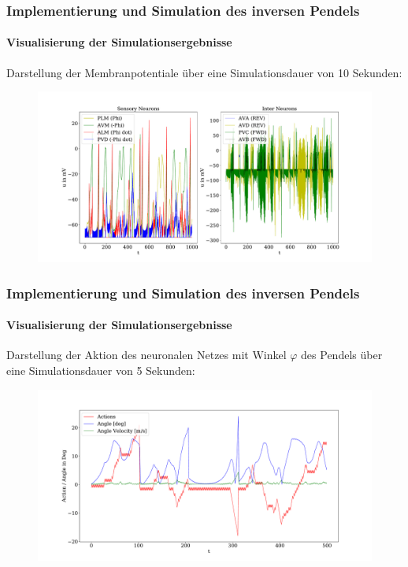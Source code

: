 \documentclass[10pt,t,aspectratio=1610]{beamer}
\newcommand{\ChapterCartpole}{Implementierung und Simulation des inversen Pendels}
\begin{document}
\begin{frame}
	\frametitle{\ChapterCartpole}
	\framesubtitle{Visualisierung der Simulationsergebnisse}
	\vspace{0.3cm}
	Darstellung der Membranpotentiale über eine Simulationsdauer von 10 Sekunden:
	\vspace{-0.2cm}
	\begin{figure}[H] %
		\centering
		\includegraphics[width=14cm]{figures/plot_membranpot_1.pdf}
		\label{fig:memb_pot}
	\end{figure}
\end{frame}


\begin{frame}
	\frametitle{\ChapterCartpole}
	\framesubtitle{Visualisierung der Simulationsergebnisse}
	\vspace{0.3cm}
	Darstellung der Aktion des neuronalen Netzes mit Winkel $\varphi$ des Pendels über eine Simulationsdauer von 5 Sekunden:
	\vspace{-0.2cm}
	\begin{figure}[H] %
		\centering
		\includegraphics[width=13cm]{figures/plot_action.pdf}
		\label{fig:action}
	\end{figure}
\end{frame}
\end{document}

